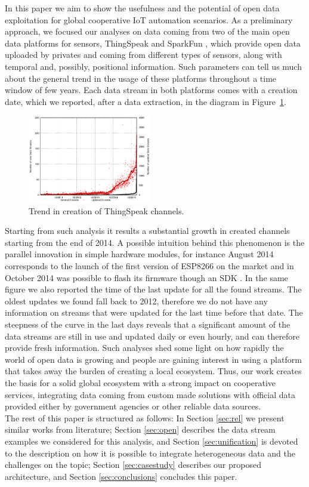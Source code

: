 In this paper we aim to show the usefulness and the potential of open data exploitation for global cooperative IoT automation scenarios.
As a preliminary approach, we focused our analyses on data coming from two of the main open data platforms for sensors, ThingSpeak \cite{thingspeak} and SparkFun \cite{sparkfun}, which provide open data uploaded by privates and coming from different types of sensors, along with temporal and, possibly, positional information.
Such parameters can tell us much about the general trend in the usage of these platforms throughout a time window of few years.
Each data stream in both platforms comes with a creation date, which we reported, after a data extraction, in the diagram in Figure~\ref{creationtrend}.

\begin{figure}[btp]
\centering
\includegraphics[width=0.48\textwidth]{img/bars.eps} 
\caption{Trend in creation of ThingSpeak channels.}
\label{creationtrend}
\end{figure}

Starting from such analysis it results a substantial growth in created channels starting from the end of 2014. 
A possible intuition behind this phenomenon is the parallel innovation in simple hardware modules, for instance August 2014 corresponds to the launch of the first version of ESP8266 \cite{esp8266} on the market and in October 2014 was possible to flash its firmware though an SDK \cite{espressif}.
In the same figure we also reported the time of the last update for all the found streams.
The oldest updates we found fall back to 2012, therefore we do not have any information on streams that were updated for the last time before that date.
The steepness of the curve in the last days reveals that a significant amount of the data streams are still in use and updated daily or even hourly, and can therefore provide fresh information.
Such analyses shed some light on how rapidly the world of open data is growing and people are gaining interest in using a platform that takes away the burden of creating a local ecosystem.
Thus, our work creates the basis for a solid global ecosystem with a strong impact on cooperative services, integrating data coming from custom made solutions with official data provided either by government agencies or other reliable data sources. 
\\

The rest of this paper is structured as follows: In Section \ref{sec:rel} we present similar works from literature; Section \ref{sec:open} describes the data stream examples we considered for this analysis, and Section \ref{sec:unification} is devoted to the description on how it is possible to integrate heterogeneous data and the challenges on the topic; Section \ref{sec:casestudy} describes our proposed architecture, and Section \ref{sec:conclusions} concludes this paper.